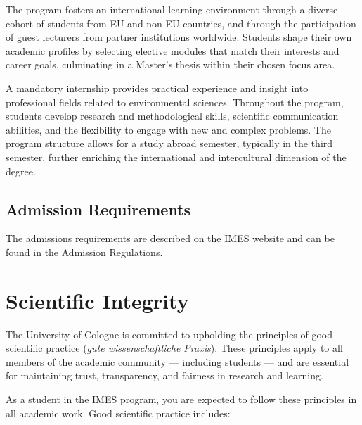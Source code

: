 \documentclass[
  letterpaper,
  10pt,
  openany]{book}
\begin{document}
The program fosters an international learning environment through a
diverse cohort of students from EU and non-EU countries, and through the
participation of guest lecturers from partner institutions worldwide.
Students shape their own academic profiles by selecting elective modules
that match their interests and career goals, culminating in a Master's
thesis within their chosen focus area.

A mandatory internship provides practical experience and insight into
professional fields related to environmental sciences. Throughout the
program, students develop research and methodological skills, scientific
communication abilities, and the flexibility to engage with new and
complex problems. The program structure allows for a study abroad
semester, typically in the third semester, further enriching the
international and intercultural dimension of the degree.

\section*{Admission Requirements}\label{admission-requirements}


The admissions requirements are described on the
\href{https://imes.uni-koeln.de/prospective-students/apply-for-the-imes-masters-program}{IMES
website} and can be found in the Admission Regulations.

\chapter*{Scientific Integrity}\label{scientific-integrity}


The University of Cologne is committed to upholding the principles of
good scientific practice (\emph{gute wissenschaftliche Praxis}). These
principles apply to all members of the academic community --- including
students --- and are essential for maintaining trust, transparency, and
fairness in research and learning.

As a student in the IMES program, you are expected to follow these
principles in all academic work. Good scientific practice includes:
\end{document}
